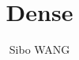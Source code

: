\documentclass[12pt]{article}
\numberwithin{equation}{section}
\theoremstyle{plain} %
\theoremstyle{definition}
\theoremstyle{remark}
\begin{document}
\title{Dense}


\author{Sibo WANG}







\date{}



\maketitle





\end{document}
